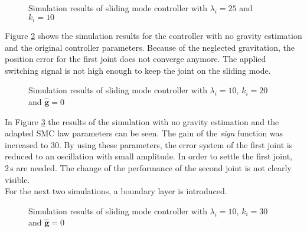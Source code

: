 \begin{figure}[H]
	\centering
	
	\caption{Simulation results of sliding mode controller with $\lambda_i = 25$ and $k_i = 10$}
	\label{fig:ch6_sim3}
\end{figure}
Figure \ref{fig:ch6_sim4} shows the simulation results for the controller with no gravity estimation and the original controller parameters. Because of the neglected gravitation, the position error for the first joint does not converge anymore. The applied switching signal is not high enough to keep the joint on the sliding mode.
\begin{figure}[H]
	\centering
	
	\caption{Simulation results of sliding mode controller with $\lambda_i = 10$, $k_i = 20$ and $\hat{\mathbf{g}} = 0$}
	\label{fig:ch6_sim4}
\end{figure}
In Figure \ref{fig:ch6_sim5} the results of the simulation with no gravity estimation and the adapted \ac{SMC} law parameters can be seen. The gain of the \textit{sign} function was increased to 30. By using these parameters, the error system of the first joint is reduced to an oscillation with small amplitude. In order to settle the first joint, $2\,\mathrm{s}$ are needed. The change of the performance of the second joint is not clearly visible.\\
For the next two simulations, a boundary layer is introduced.
\begin{figure}[H]
	\centering
	
	\caption{Simulation results of sliding mode controller with $\lambda_i = 10$, $k_i = 30$ and $\hat{\mathbf{g}} = 0$}
	\label{fig:ch6_sim5}
\end{figure}
